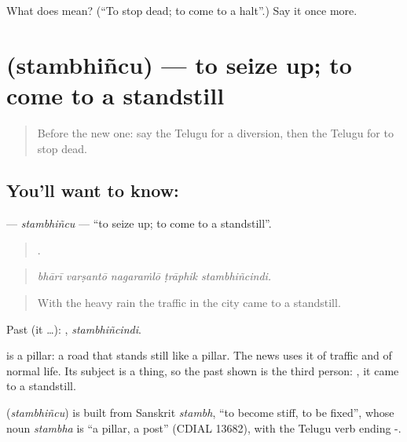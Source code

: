 \begin{tcolorbox}[breakable,colback=teal!4,colframe=teal!35!black,title={Before you move on}]
What does  mean? (\textquotedblleft{}To stop dead; to come to a halt\textquotedblright{}.) Say it once more.
\end{tcolorbox}
\section[\texorpdfstring{\te{స్తంభించు} (stambhiñcu)}{స్తంభించు (stambhiñcu)}]{ (stambhiñcu) — to seize up; to come to a standstill}

\label{lesson:TE-C449-stambhincu}



\begin{quote}
Before the new one: say the Telugu for a diversion, then the Telugu for to stop dead.
\end{quote}

\subsection*{You'll want to know: }
\textbf{} — \emph{stambhiñcu} — \textquotedblleft{}to seize up; to come to a standstill\textquotedblright{}.

\begin{quote}
    .
\end{quote}

\begin{quote}
\emph{bhārī varṣantō nagaraṁlō ṭrāphik stambhiñcindi.}
\end{quote}

\begin{quote}
With the heavy rain the traffic in the city came to a standstill.
\end{quote}

Past (it …): , \emph{stambhiñcindi}.

 is a pillar: a road that stands still like a pillar. The news uses it of traffic and of normal life. Its subject is a thing, so the past shown is the third person: , it came to a standstill.

\begin{cousinweb}
\textbf{} (\emph{stambhiñcu}) is built from Sanskrit \emph{stambh}, \textquotedblleft{}to become stiff, to be fixed\textquotedblright{}, whose noun \emph{stambha} is \textquotedblleft{}a pillar, a post\textquotedblright{} (CDIAL 13682), with the Telugu verb ending -.
\end{cousinweb}

